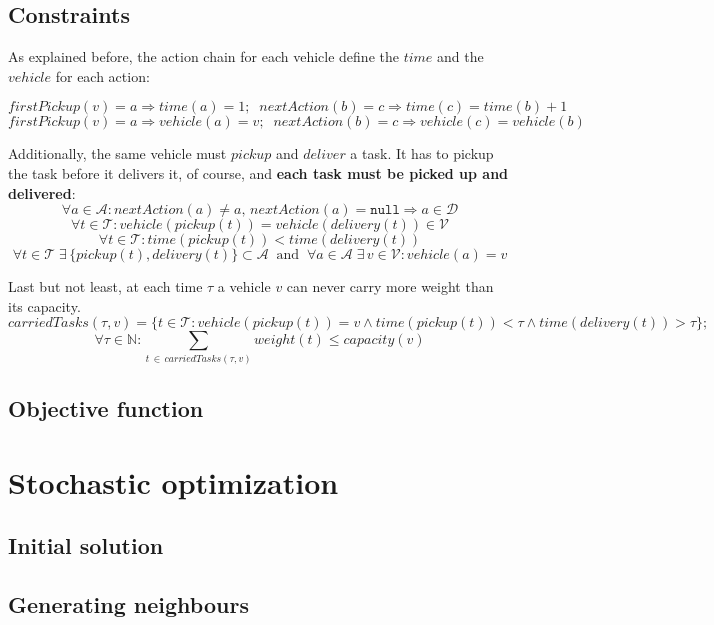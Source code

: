 \documentclass[11pt]{article}
\begin{document}
\subsection{Constraints}
As explained before, the action chain for each vehicle define the $time$ 
and the $vehicle$ for each action:

$$
firstPickup(v) = a \Rightarrow time(a) = 1; \;\;
nextAction(b) = c \Rightarrow time(c) = time(b) + 1
$$
$$
firstPickup(v) = a \Rightarrow vehicle(a) = v; \;\;
nextAction(b) = c \Rightarrow vehicle(c) = vehicle(b)
$$

Additionally, the same vehicle must $pickup$ and $deliver$ a task. 
It has to pickup the task before it delivers it, of course, 
and \textbf{each task must be picked up and delivered}:
$$
\forall a \in \mathcal{A}  :
nextAction(a) \neq a, \,
nextAction(a) = \mathtt{null} \Rightarrow a \in \mathcal{D}
$$
$$
\forall t \in \mathcal{T}: 
vehicle(pickup(t)) = vehicle(delivery(t)) \in \mathcal{V}
$$
$$
\forall t \in \mathcal{T}: 
time(pickup(t)) < time(delivery(t))
$$
$$
\forall t \in \mathcal{T} \; 
\exists  \, \{ pickup(t), delivery(t) \} \subset \mathcal{A} \;\;
\text{and} \;\;
\forall a \in \mathcal{A} \;
\exists \, v \in \mathcal{V} : 
vehicle(a) = v
$$

Last but not least, at each time $\tau$ a vehicle $v$ can never 
carry more weight than its capacity.
$$
carriedTasks(\tau, v) = \{t \in \mathcal{T}: 
vehicle(pickup(t)) = v \wedge 
time(pickup(t)) < \tau \wedge 
time(delivery(t)) > \tau \};
$$
$$
\forall \tau \in \mathbb{N}:
\sum_{t \, \in \, carriedTasks(\tau, v)} weight(t) \leq
capacity(v)
$$



\subsection{Objective function}


\section{Stochastic optimization}

\subsection{Initial solution}

\subsection{Generating neighbours}
\end{document}
